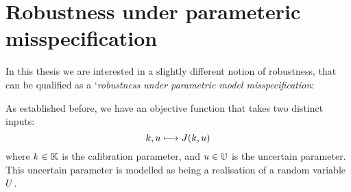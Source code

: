 \documentclass[../../Main_ManuscritThese.tex]{subfiles}
\begin{document}
\begin{table}[htb]
\centering
{}
\caption{Types of problems, depending on their deterministic nature for the constraints or the objective. Reproduced from~\cite{lelievre_consideration_2016}}
\label{tab:lelievre}
\end{table}

\section{Robustness under parameteric misspecification}
In this thesis we are interested in a slightly different notion of robustness, that can be qualified as a `\emph{robustness under parametric model misspecification}:


As established before, we have an objective function that takes two distinct inputs:
\begin{equation}
  \label{eq:def_J}
  k, u \longmapsto J(k,u)
\end{equation}
where $k\in \mathbb{K}$ is the calibration parameter, and $u \in \mathbb{U}$ is the uncertain parameter. This uncertain parameter is modelled as being a realisation of a random variable $U$.
\end{document}
